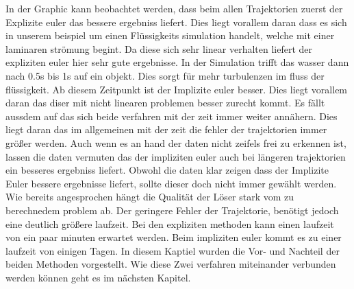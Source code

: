 In der Graphic kann beobachtet werden, dass beim allen Trajektorien zuerst der Explizite euler das bessere ergebniss liefert.
Dies liegt vorallem daran dass es sich in unserem beispiel 
um einen Flüssigkeits simulation handelt, welche mit einer laminaren strömung begint.
Da diese sich sehr linear verhalten liefert der expliziten 
euler hier sehr gute ergebnisse.
In der Simulation trifft das wasser dann nach 0.5s bis 1s
auf ein objekt.
Dies sorgt für mehr turbulenzen im fluss der flüssigkeit.
Ab diesem Zeitpunkt ist der Implizite euler besser.
Dies liegt vorallem daran das diser mit nicht linearen problemen besser zurecht kommt.
Es fällt aussdem auf das sich beide verfahren mit der zeit
immer weiter annähern.
Dies liegt daran das im allgemeinen mit der zeit die fehler der
trajektorien immer größer werden.
Auch wenn es an hand der daten nicht zeifels frei zu erkennen ist,
lassen die daten vermuten das der impliziten euler auch bei längeren trajektorien ein besseres ergebniss liefert.
Obwohl die daten klar zeigen dass der Implizite Euler bessere
ergebnisse liefert, sollte dieser doch nicht immer gewählt werden.
Wie bereits angesprochen hängt die Qualität der Löser stark vom zu berechnedem problem ab.
Der geringere Fehler der Trajektorie, benötigt jedoch eine deutlich
größere laufzeit.
Bei den expliziten methoden kann einen laufzeit von ein paar minuten 
erwartet werden. Beim impliziten euler kommt es zu einer laufzeit von einigen Tagen. 
In diesem Kaptiel wurden die Vor- und Nachteil der beiden Methoden vorgestellt.
Wie diese Zwei verfahren miteinander verbunden werden können geht es im nächsten Kapitel.
